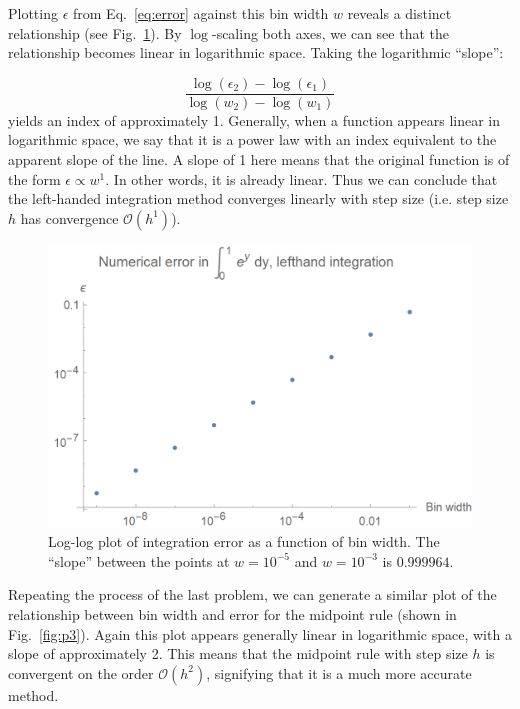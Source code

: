 \documentclass{article}
\begin{document}
Plotting $\epsilon$ from Eq.~\ref{eq:error} against this bin width $w$ reveals a distinct relationship (see Fig.~\ref{fig:p2}). By $\log$-scaling both axes, we can see that the relationship becomes linear in logarithmic space. Taking the logarithmic ``slope'':

\begin{equation}\label{eq:logslope}
    \frac{\log(\epsilon_2)-\log(\epsilon_1)}{\log(w_2)-\log(w_1)}
\end{equation}
yields an index of approximately 1. Generally, when a function appears linear in logarithmic space, we say that it is a power law with an index equivalent to the apparent slope of the line. A slope of 1 here means that the original function is of the form $\epsilon \propto w^1$. In other words, it is already linear. Thus we can conclude that the left-handed integration method converges linearly with step size (i.e. step size $h$ has convergence $\mathcal{O}(h^1)$).

\begin{figure}[!h]
    \centering
    \includegraphics[width=4.75in]{homework2/P2.png}
    \caption{Log-log plot of integration error as a function of bin width. The ``slope'' between the points at $w=10^{-5}$ and $w=10^{-3}$ is $0.999964$.}
    \label{fig:p2}
\end{figure}

\newpage

\bigskip
{}
\medskip

Repeating the process of the last problem, we can generate a similar plot of the relationship between bin width and error for the midpoint rule (shown in Fig.~\ref{fig:p3}). Again this plot appears generally linear in logarithmic space, with a slope of approximately 2. This means that the midpoint rule with step size $h$ is convergent on the order $\mathcal{O}(h^2)$, signifying that it is a much more accurate method.
\end{document}
